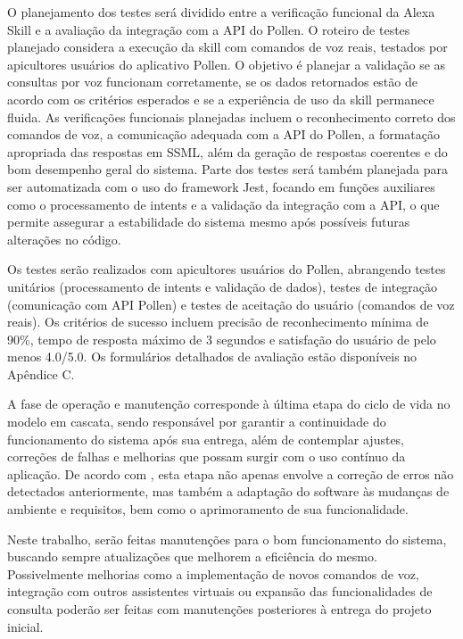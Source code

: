 O planejamento dos testes será dividido entre a verificação funcional da Alexa Skill e a avaliação da integração com a API do Pollen. 
O roteiro de testes planejado considera a execução da skill com comandos de voz reais, testados por apicultores usuários do aplicativo Pollen. 
O objetivo é planejar a validação se as consultas por voz funcionam corretamente, se os dados retornados estão de acordo com os critérios esperados e se a experiência de uso da skill permanece fluida. 
As verificações funcionais planejadas incluem o reconhecimento correto dos comandos de voz, a comunicação adequada com a API do Pollen, a formatação apropriada das respostas em SSML, 
além da geração de respostas coerentes e do bom desempenho geral do sistema. Parte dos testes será também planejada para ser automatizada com o uso do framework Jest, 
focando em funções auxiliares como o processamento de intents e a validação da integração com a API, o que permite assegurar a estabilidade do sistema mesmo após possíveis futuras alterações no código.

Os testes serão realizados com apicultores usuários do Pollen, abrangendo testes unitários (processamento de intents e validação de dados), testes de integração (comunicação com API Pollen) e testes de aceitação do usuário (comandos de voz reais). Os critérios de sucesso incluem precisão de reconhecimento mínima de 90\%, tempo de resposta máximo de 3 segundos e satisfação do usuário de pelo menos 4.0/5.0. Os formulários detalhados de avaliação estão disponíveis no Apêndice C.

\label{sssec:operação}

A fase de operação e manutenção corresponde à última etapa do ciclo de vida no modelo em cascata, sendo responsável por garantir a continuidade do funcionamento do sistema após sua entrega, 
além de contemplar ajustes, correções de falhas e melhorias que possam surgir com o uso contínuo da aplicação. De acordo com \textcite{pressman2016}, esta etapa não apenas envolve a correção de erros não detectados anteriormente, 
mas também a adaptação do software às mudanças de ambiente e requisitos, bem como o aprimoramento de sua funcionalidade.

Neste trabalho, serão feitas manutenções para o bom funcionamento do sistema, buscando sempre atualizações que melhorem a eficiência do mesmo. 
Possivelmente melhorias como a implementação de novos comandos de voz, integração com outros assistentes virtuais ou expansão das funcionalidades de consulta poderão ser feitas com manutenções posteriores à entrega do projeto inicial.

